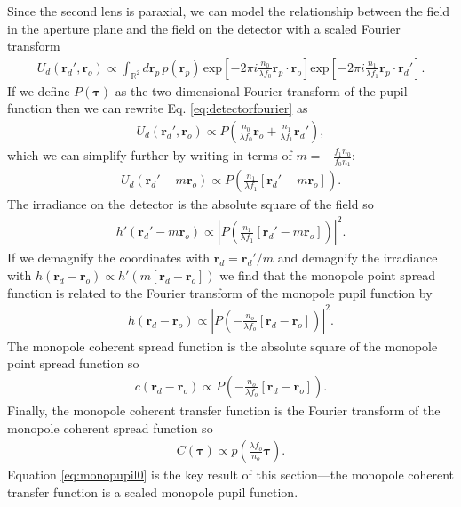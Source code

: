 \documentclass[]{osa-article}
\providecommand{\ro}{\mathbf{\mathbf{r}}_o}
\providecommand{\rp}{\mathbf{r}_p}
\providecommand{\rd}{\mathbf{r}_d}
\providecommand{\mbb}[1]{\mathbb{#1}}
\providecommand{\bs}[1]{\boldsymbol{#1}}
\providecommand{\taup}{\bs{\tau}}
\begin{document}
Since the second lens is paraxial, we can model the relationship between the
field in the aperture plane and the field on the detector with a scaled Fourier
transform \cite{goodman1996}
\begin{align}
   U_d(\rd', \ro) \propto \int_{\mbb{R}^2}d\rp\, p(\rp)\,\text{exp}\left[-2\pi i \frac{n_0}{\lambda f_0} \rp\cdot\ro \right]\text{exp}\left[-2\pi i \frac{n_1}{\lambda f_1} \rp\cdot\rd' \right]. \label{eq:detectorfourier}
\end{align}
If we define $P(\taup)$ as the two-dimensional Fourier transform of the pupil function
then we can rewrite Eq. \ref{eq:detectorfourier} as
\begin{align}
  U_d(\rd', \ro) \propto P\left(\frac{n_0}{\lambda f_0}\ro + \frac{n_1}{\lambda f_1}\rd'\right),
\end{align}
which we can simplify further by writing in terms of
$m = -\frac{f_1n_0}{f_0n_1}$:
\begin{align}
  U_d(\rd' - m\ro) \propto P\left(\frac{n_1}{\lambda f_1}[\rd' - m\ro]\right).
\end{align}
The irradiance on the detector is the absolute square of the field so
\begin{align}
  h'(\rd' - m\ro) \propto \left|P\left(\frac{n_1}{\lambda f_1}[\rd' - m\ro]\right)\right|^2.
\end{align}
If we demagnify the coordinates with $\rd = \rd'/m$ and demagnify the irradiance
with $h(\rd - \ro) \propto h'(m[\rd - \ro])$ we find that the monopole point spread
function is related to the Fourier transform of the monopole pupil function by
\begin{align}
  h(\rd - \ro) \propto \left|P\left(-\frac{n_o}{\lambda f_o}[\rd - \ro]\right)\right|^2.
\end{align}
The monopole coherent spread function is the absolute square of the monopole point spread function so
\begin{align}
  c(\rd - \ro) \propto P\left(-\frac{n_o}{\lambda f_o}[\rd - \ro]\right).
\end{align}
Finally, the monopole coherent transfer function is the Fourier transform of the
monopole coherent spread function so
\begin{align}
  C(\taup) \propto p\left(\frac{\lambda f_o}{n_o}\taup\right). \label{eq:monopupil0}
\end{align}
Equation \ref{eq:monopupil0} is the key result of this section---the monopole
coherent transfer function is a scaled monopole pupil function.
\end{document}
